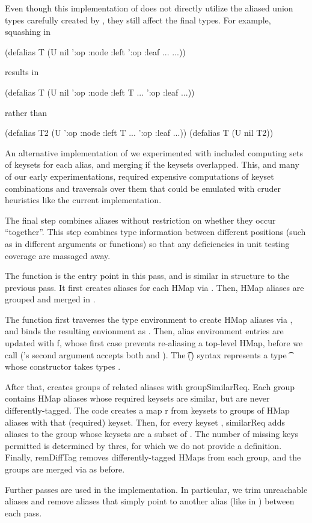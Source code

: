 Even though this implementation of \shouldmergeOp{} does not directly utilize the aliased
union types carefully created by \aliashmap{}, they still affect the final types.
For example, squashing  in
\begin{cljlisting}
(defalias T 
  (U nil '{:op :node :left '{:op :leaf ...} ...}))
\end{cljlisting}
results in 
\begin{cljlisting}
(defalias T 
  (U nil '{:op :node :left T ...} '{:op :leaf ...}))
\end{cljlisting}
rather than
\begin{cljlisting}
(defalias T2 (U '{:op :node :left T ...}
                '{:op :leaf ...}))
(defalias T (U nil T2))
\end{cljlisting}
An alternative implementation of \shouldmergeOp{} we experimented with included computing sets of keysets
for each alias, and merging if the keysets overlapped. This, and many of our early experimentations,
required expensive computations of keyset combinations and traversals over them that could be emulated
with cruder heuristics like the current implementation.

\label{infer:sec:formal:inference-phase:squash-global}

The final step combines aliases
without restriction on whether they occur ``together''.
This step combines type information between different positions
(such as in different arguments or functions) so that any deficiencies
in unit testing coverage are massaged away.

The \squashglobal{} function is the entry point in this pass,
and is similar in structure to the previous pass.
It first creates aliases for each HMap via \aliassinglehmap{}.
Then, HMap aliases are grouped and merged in \squashhorizonally{}.

The \aliassinglehmap{} function first traverses the type environment
to create HMap aliases via \singlehmap{}, and binds the resulting
envionment as \atenvp{}.
Then, alias environment entries are updated with \textsf{f}, whose first
case prevents re-aliasing a top-level HMap, before we call \singlehmap{}
(\singlehmap{}'s second argument accepts both \x{} and \alias{}).
The \t{}(\ova{\s{}}) syntax represents a type \t{} whose constructor
takes types \ova{\s{}}.

After that, \squashhorizonally{} creates groups of related
aliases with \textsf{groupSimilarReq}.
Each group contains HMap aliases whose required keysets are similar,
but are never differently-tagged.
The code creates a map \textsf{r} from keysets to groups of HMap
aliases with that (required) keyset.
Then, for every keyset \ova{\kw{}}, \textsf{similarReq} adds aliases to the group
whose keysets are a subset of \ova{\kw{}}. The number of missing
keys permitted is determined by \textsf{thres}, for which we do not provide a
definition.
Finally, \textsf{remDiffTag} removes differently-tagged HMaps from each group,
and the groups are merged via \mergealiases{} as before.


Further passes are used in the implementation.
In particular, we trim unreachable aliases and remove aliases
that simply point to another alias (like  in \mergealiases{})
between each pass.


